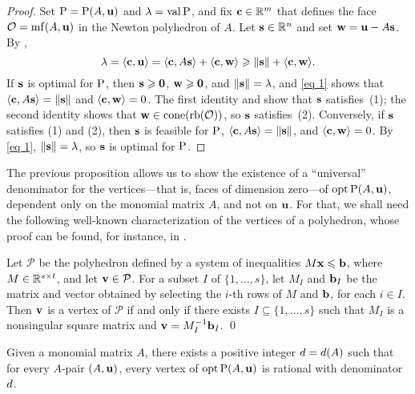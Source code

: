 \documentclass{amsart}
\begin{document}
\begin{proof}
   Set $\mathrm{P} = \mathrm{P}(A, \mathbf{u})$ and $\lambda = \operatorname{val} \mathrm{P} $, and fix $\mathbf{c} \in \mathbb{R}^m$ that defines the face $\mathcal{O} = \operatorname{mf}(A, \mathbf{u})$ in the Newton polyhedron of $A$.
   Let $\mathbf{s} \in \mathbb{R}^n$ and set $\mathbf{w} = \mathbf{u} - A\mathbf{s}$.
   By ,
   \begin{equation}\label{eq 1}
      \lambda = \langle \mathbf{c}, \mathbf{u} \rangle = \langle \mathbf{c}, A \mathbf{s} \rangle + \langle \mathbf{c}, \mathbf{w} \rangle \geqslant \| \mathbf{s} \| + \langle \mathbf{c}, \mathbf{w} \rangle.
   \end{equation}
   If $\mathbf{s}$ is optimal for $\mathrm{P}$, then $\mathbf{s} \geqslant \mathbf{0}$, $\mathbf{w} \geqslant \mathbf{0}$, and $\| \mathbf{s} \| = \lambda$, and \eqref{eq 1} shows that $\langle \mathbf{c}, A \mathbf{s} \rangle = \| \mathbf{s} \|$ and $\langle \mathbf{c}, \mathbf{w} \rangle = 0$.
   The first identity and  show that $\mathbf{s}$ satisfies~(1); the second identity shows that $\mathbf{w}\in \operatorname{cone}(\operatorname{rb}(\mathcal{O}))$, so $\mathbf{s}$ satisfies~(2).
   Conversely, if $\mathbf{s}$ satisfies (1) and (2), then $\mathbf{s}$ is feasible for $\mathrm{P}$, $\langle \mathbf{c}, A \mathbf{s} \rangle = \| \mathbf{s} \|$, and $\langle \mathbf{c}, \mathbf{w} \rangle = 0$.
   By \eqref{eq 1}, $\| \mathbf{s} \| = \lambda$, so $\mathbf{s}$ is optimal for $\mathrm{P}$.
\end{proof}

The previous proposition allows us to show the existence of a ``universal'' denominator for the vertices---that is, faces of dimension zero---of $\operatorname{opt}\mathrm{P}(A,\mathbf{u})$, dependent only on the monomial matrix $A$, and not on $\mathbf{u}$.
For that, we shall need the following well-known characterization of the vertices of a polyhedron, whose proof can be found, for instance, in \cite[Theorem~3.34]{conforti+etal.integer_programming}.

\begin{lemma}
   \label{prop: characterization of vertices}
   Let $\mathcal{P}$ be the polyhedron defined by a system of inequalities $M \mathbf{x} \leqslant \mathbf{b}$, where $M\in \mathbb{R}^{s\times t}$, and let $\mathbf{v} \in \mathcal{P}$.
   For a subset $I$ of $\{1,\ldots,s\}$, let $M_I$ and $\mathbf{b}_I$ be the matrix and vector obtained by selecting the $i$-th rows of $M$ and $\mathbf{b}$, for each $i\in I$.
   Then $\mathbf{v}$ is a vertex of $\mathcal{P}$ if and only if there exists $I \subseteq \{1,\ldots,s\}$ such that $M_I$ is a nonsingular square matrix and $\mathbf{v} = M_I^{-1}\mathbf{b}_I$.
\qed
\end{lemma}

\begin{theorem}
   \label{uniform denominators for vertices:  T}
   Given a monomial matrix $A$, there exists a positive integer $d = d(A)$ such that for every $A$-pair $(A, \mathbf{u})$, every vertex of $\operatorname{opt} \mathrm{P}(A, \mathbf{u})$ is rational with denominator $d$.
\end{theorem}
\end{document}
